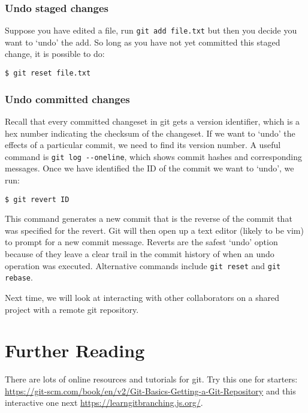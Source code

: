 \documentclass{article}
\begin{document}
\subsubsection*{Undo staged changes}
Suppose you have edited a file, run \texttt{git add file.txt} but then you decide you want to `undo' the add. So long as you have not yet committed this staged change, it is possible to do:
\begin{lstlisting}[style=BashInputStyle]
    $ git reset file.txt
\end{lstlisting}

\subsubsection*{Undo committed changes}
Recall that every committed changeset in git gets a version identifier, which is a hex number indicating the checksum of the changeset.
If we want to `undo' the effects of a particular commit, we need to find its
version number.
A useful command is \lstinline{git log --oneline}, which shows commit hashes and corresponding messages. Once we have identified the ID of the commit we want to `undo', we run:
\begin{lstlisting}[style=BashInputStyle]
    $ git revert ID
\end{lstlisting}

This command generates a new commit that is the reverse of the commit that was specified for the revert. Git will then open up a text editor (likely to be vim) to prompt for a new commit message. Reverts are the safest `undo' option because of they leave a clear trail in the commit history of when an undo operation was executed. Alternative commands include
\lstinline{git reset} and \lstinline{git rebase}.

Next time, we will look at interacting with other collaborators on a shared
project with a remote git repository.


\section*{Further Reading}

There are lots of online resources and tutorials for git.
Try this one for starters: \url{https://git-scm.com/book/en/v2/Git-Basics-Getting-a-Git-Repository} and this interactive one next
\url{https://learngitbranching.js.org/}.
\end{document}
